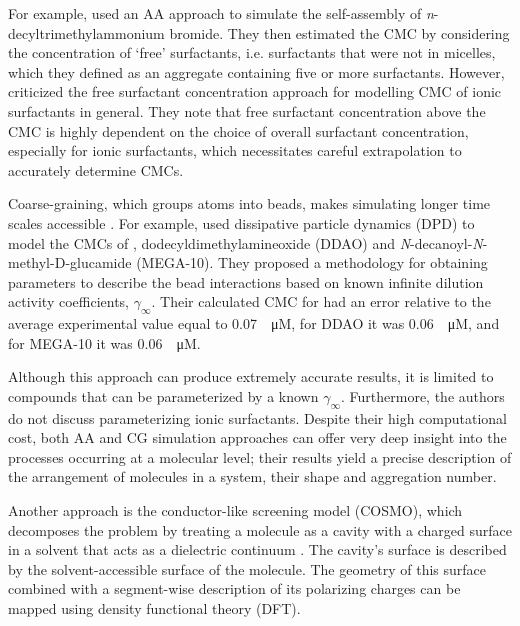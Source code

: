 For example, \citet{jorgeMolecularDynamicsSimulation2008} used an AA approach to
simulate the self-assembly of \textit{n}-decyltrimethylammonium bromide. They
then estimated the CMC by considering the concentration of `free' surfactants,
i.e. surfactants that were not in micelles, which they defined as an aggregate
containing five or more surfactants. However,
\citet{jusufiExplicitImplicitSolventSimulations2015} criticized the free
surfactant concentration approach for modelling CMC of ionic surfactants in
general. They note that free surfactant concentration above the CMC is highly
dependent on the choice of overall surfactant concentration, especially for
ionic surfactants, which necessitates careful extrapolation to accurately
determine CMCs.

Coarse-graining, which groups atoms into beads, makes simulating longer time
scales accessible \cite{fitzgeraldMultiscaleModelingNanomaterials2015}. For
example, \citet{vishnyakovPredictionCriticalMicelle2013} used dissipative
particle dynamics (DPD) to model the CMCs of ,
dodecyldimethylamineoxide (DDAO) and
\textit{N}-decanoyl-\textit{N}-methyl-\textsc{D}-glucamide (MEGA-10). They
proposed a methodology for obtaining parameters to describe the bead
interactions based on known infinite dilution activity coefficients,
$\gamma_\infty$. Their calculated CMC for  had an error relative to the
average experimental value equal to \SI{0.07}{\log \micro M}, for DDAO it was
\SI{0.06}{\log \micro M}, and for MEGA-10 it was \SI{0.06}{\log \micro M}.

Although this approach can produce extremely accurate results, it is limited to
compounds that can be parameterized by a known $\gamma_\infty$. Furthermore, the
authors do not discuss parameterizing ionic surfactants. Despite their high
computational cost, both AA and CG simulation approaches can offer very deep
insight into the processes occurring at a molecular level; their results yield a
precise description of the arrangement of molecules in a system, their shape and
aggregation number.

Another approach is the conductor-like screening model (COSMO), which decomposes
the problem by treating a molecule as a cavity with a charged surface in a
solvent that acts as a dielectric continuum \cite{klamtCOSMONewApproach1993}.
The cavity's surface is described by the solvent-accessible surface of the
molecule. The geometry of this surface combined with a segment-wise description
of its polarizing charges can be mapped using density functional theory (DFT).

